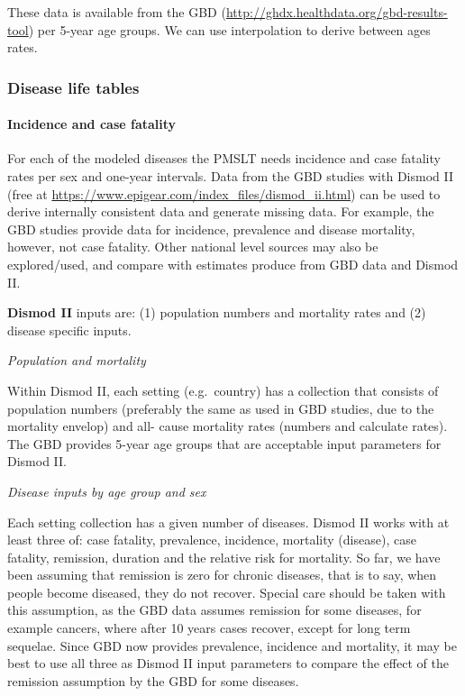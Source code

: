 \documentclass[]{article}
\let\oldparagraph\paragraph
\renewcommand{\paragraph}[1]{\oldparagraph{#1}\mbox{}}
\begin{document}
These data is available from the GBD
(\url{http://ghdx.healthdata.org/gbd-results-tool}) per 5-year age
groups. We can use interpolation to derive between ages rates.

\subsubsection{\texorpdfstring{\textbf{Disease life
tables}}{Disease life tables}}\label{disease-life-tables}

\paragraph{Incidence and case
fatality}\label{incidence-and-case-fatality}

For each of the modeled diseases the PMSLT needs incidence and case
fatality rates per sex and one-year intervals. Data from the GBD studies
with Dismod II (free at
\url{https://www.epigear.com/index_files/dismod_ii.html}) can be used to
derive internally consistent data and generate missing data. For
example, the GBD studies provide data for incidence, prevalence and
disease mortality, however, not case fatality. Other national level
sources may also be explored/used, and compare with estimates produce
from GBD data and Dismod II.

\textbf{Dismod II} inputs are: (1) population numbers and mortality
rates and (2) disease specific inputs.

\emph{Population and mortality}

Within Dismod II, each setting (e.g.~country) has a collection that
consists of population numbers (preferably the same as used in GBD
studies, due to the mortality envelop) and all- cause mortality rates
(numbers and calculate rates). The GBD provides 5-year age groups that
are acceptable input parameters for Dismod II.

\emph{Disease inputs by age group and sex}

Each setting collection has a given number of diseases. Dismod II works
with at least three of: case fatality, prevalence, incidence, mortality
(disease), case fatality, remission, duration and the relative risk for
mortality. So far, we have been assuming that remission is zero for
chronic diseases, that is to say, when people become diseased, they do
not recover. Special care should be taken with this assumption, as the
GBD data assumes remission for some diseases, for example cancers, where
after 10 years cases recover, except for long term sequelae. Since GBD
now provides prevalence, incidence and mortality, it may be best to use
all three as Dismod II input parameters to compare the effect of the
remission assumption by the GBD for some diseases.
\end{document}
